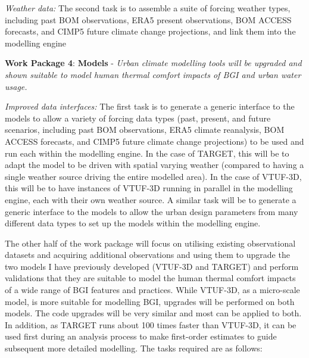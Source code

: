 \emph{Weather data:} The second task is to assemble a suite of forcing weather types, including past BOM observations, ERA5 present observations, BOM ACCESS forecasts, and CIMP5 future climate change projections, and link them into the modelling engine

\textbf{Work Package 4}: \textbf{Models} - \emph{Urban climate modelling tools will be upgraded and shown suitable to model human thermal comfort impacts of BGI and urban water usage.  }

\emph{Improved data interfaces:} The first task is to generate a generic interface to the models to allow a variety of forcing data types (past, present, and future scenarios, including past BOM observations, ERA5 climate reanalysis, BOM ACCESS forecasts, and CIMP5 future climate change projections) to be used and run each within the modelling engine. In the case of TARGET, this will be to adapt the model to be driven with spatial varying weather (compared to having a single weather source driving the entire modelled area). In the case of VTUF-3D, this will be to have instances of VTUF-3D running in parallel in the modelling engine, each with their own weather source. A similar task will be to generate a generic interface to the models to allow the urban design parameters from many different data types to set up the models within the modelling engine.

The other half of the work package will focus on utilising existing observational datasets and acquiring additional observations and using them to upgrade the two models I have previously developed (VTUF-3D and TARGET) and perform validations that they are suitable to model the human thermal comfort impacts of a wide range of BGI features and practices. While VTUF-3D, as a micro-scale model, is more suitable for modelling BGI, upgrades will be performed on both models. The code upgrades will be very similar and most can be applied to both. In addition, as TARGET runs about 100 times faster than VTUF-3D, it can be used first during an analysis process to make first-order estimates to guide subsequent more detailed modelling.  The tasks required are as follows:

